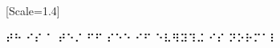 \documentclass{scrartcl}
\begin{document}
\setmainfont{LouisLouis.ttf}[Scale=1.4]

\doublespacing

⠞⠓ ⠊⠎ ⠁ ⠞⠑⠌ ⠋⠋ ⠎⠑⠑ ⠊⠋ ⠑⠧⠻⠽⠹⠬ ⠊⠎ ⠝⠕⠗⠍⠁⠇ 
\end{document}
